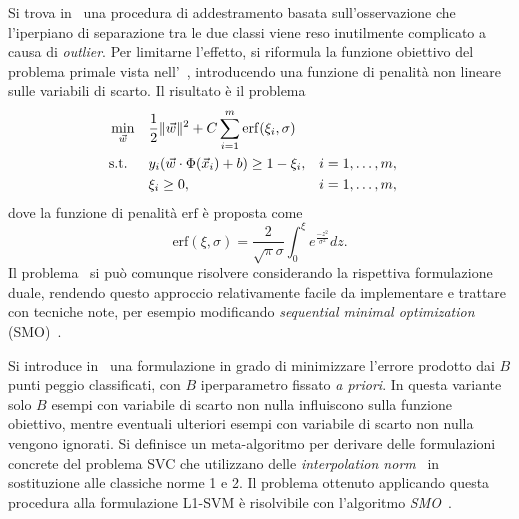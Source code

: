 Si trova in~\cite{2005_penalizing_outliers} una procedura di addestramento basata sull'osservazione che l'iperpiano di separazione tra le due classi viene reso inutilmente complicato a causa di \emph{outlier}. 
Per limitarne l'effetto, si riformula la funzione obiettivo del problema primale vista nell'~, introducendo una funzione di penalità non lineare sulle variabili di scarto. Il risultato è il problema
\begin{equation}\label{eq:adaptively_penalizing_outliers}
\begin{aligned}
& \min_{\Vec{w}}    && \frac{1}{2}\|\Vec{w}\|^2 +C \sum_{i=1}^{m}\mathrm{erf}(\xi_i, \sigma) \\
& \textrm{s.t.}     && y_i(\Vec{w}\cdot\Phi(\Vec{x}_i) + b) \geq 1 -\xi_i, && i=1,\dots,m,\\
&                   && \xi_i \geq 0,  && i=1,\dots,m,
\end{aligned}
\end{equation}
dove la funzione di penalità $\mathrm{erf}$ è proposta come
\[
\mathrm{erf}(\xi, \sigma) = \frac{2}{\sqrt{\pi}\sigma} \int_{0}^{\xi}e^{\frac{-z^2}{\sigma^2}} dz.
\]
%
Il problema~ si può comunque risolvere considerando la rispettiva formulazione duale, rendendo questo approccio relativamente facile da implementare e trattare con tecniche note, per esempio modificando \emph{sequential minimal optimization} (SMO)~\cite{SMO}.


Si introduce in~\cite{2006_svm_on_a_budget} una formulazione in grado di minimizzare l'errore prodotto dai $B$ punti peggio classificati, con $B$ iperparametro fissato \emph{a priori}. 
In questa variante solo $B$ esempi con variabile di scarto non nulla influiscono sulla funzione obiettivo, mentre eventuali ulteriori esempi con variabile di scarto non nulla vengono ignorati.
Si definisce un meta-algoritmo per derivare delle formulazioni concrete del problema SVC che utilizzano delle \emph{interpolation norm}~\cite{norm_interpolation} in sostituzione alle classiche norme 1 e 2. 
Il problema ottenuto applicando questa procedura alla formulazione L1-SVM è risolvibile con l'algoritmo \emph{SMO}~\cite{SMO}.

